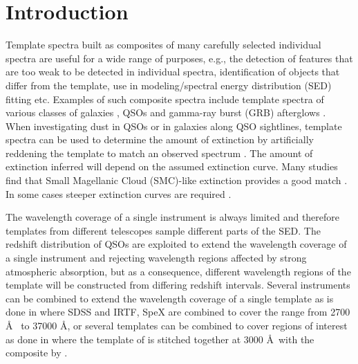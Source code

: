 \documentclass{aa}    %
\newcommand{\sectlabel}[1]{\label{sect:#1}}
\begin{document}
\section{Introduction}     \sectlabel{introduction}
Template spectra built as composites of many carefully selected
individual spectra are useful for a wide range of purposes, e.g., the
detection of features that are too weak to be detected in individual
spectra, identification of objects that differ from the template, use
in modeling/spectral energy distribution (SED) fitting etc. Examples of such composite spectra
include template spectra of various classes of galaxies
\citep{Mannucci2001, Shapley2003, Dobos2012}, QSOs
\citep{CristianiS.andVio1990, Boyle1990, Francis1991, Zheng1997,
  Brotherton2000, VandenBerk2001, Telfer2002, Richards2006a,
  Glikman2006, Lusso2015} and gamma-ray burst (GRB) afterglows \citep{Christensen2011}.
When investigating dust in QSOs or in galaxies along QSO sightlines, template spectra can be used to determine the amount of
extinction by artificially reddening the template to match an observed
spectrum
\citep[e.g.,][]{Glikman2007,Urrutia2009,Wang2012,Fynbo2013,Krogager2015}.
The amount of extinction inferred will depend on the assumed
extinction curve. Many studies find that Small Magellanic Cloud (SMC)-like extinction provides
a good match \citep{Richards2003,Hopkins2004}. In some cases steeper
extinction curves are required
\citep{Fynbo2013,Jiang2013,Leighly2014}.

The wavelength coverage of a single instrument is always limited and
therefore templates from different telescopes sample different parts
of the SED. The redshift distribution of QSOs
are exploited to extend the wavelength coverage of a single instrument
and rejecting wavelength regions affected by strong atmospheric
absorption, but as a consequence, different wavelength regions of the
template will be constructed from differing redshift
intervals. Several instruments can be combined to extend the
wavelength coverage of a single template as is done in
\citet{Glikman2006} where SDSS \citep{Gunn2006} and IRTF, SpeX
\citep{Rayner2003} are combined to cover the range from 2700 \AA~ to
37000 \AA, or several templates can be combined to cover regions of
interest as done in \citet{Zhou2010} where the template of
\citet{VandenBerk2001} is stitched together at 3000 \AA~with the
composite by \citet{Glikman2006}. 
\end{document}
